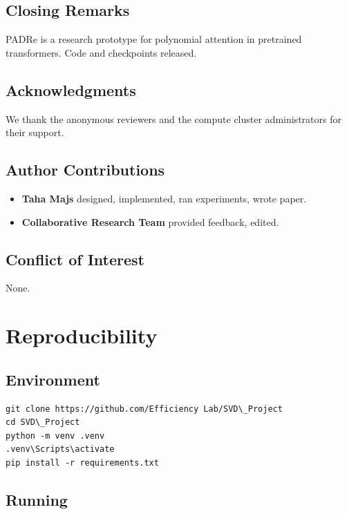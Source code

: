 \subsection{Closing Remarks}

PADRe is a research prototype for polynomial attention in pretrained 
transformers. Code and checkpoints released.

\subsection{Acknowledgments}

We thank the anonymous reviewers and the compute cluster administrators for their support.

\subsection{Author Contributions}

\begin{itemize}
\item \textbf{Taha Majs} designed, implemented, ran experiments, wrote paper.
\item \textbf{Collaborative Research Team} provided feedback, edited.

\end{itemize}
\subsection{Conflict of Interest}

None.



\section{Reproducibility}

\subsection{Environment}

\begin{lstlisting}
git clone https://github.com/Efficiency Lab/SVD\_Project
cd SVD\_Project
python -m venv .venv
.venv\Scripts\activate
pip install -r requirements.txt
\end{lstlisting}

\subsection{Running}

